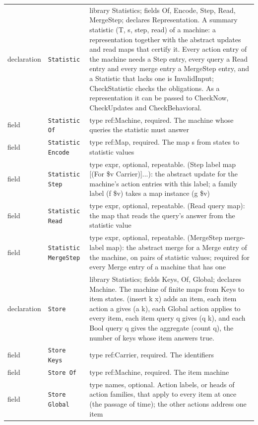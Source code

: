 \documentclass[11pt]{article}
\newcommand{\code}[1]{\texttt{#1}}
\theoremstyle{definition}
\theoremstyle{plain}
\begin{document}
\begin{footnotesize}
\begin{longtable}{>{\raggedright\arraybackslash}p{1.9cm}>{\raggedright\arraybackslash}p{3.3cm}>{\raggedright\arraybackslash}p{9.0cm}}
declaration & \code{Statistic} & library Statistics; fields Of, Encode, Step, Read, MergeStep; declares Representation. A summary statistic (T, s, step, read) of a machine:\allowbreak{} a representation together with the abstract updates and read maps that certify it.  Every action entry of the machine needs a Step entry, every query a Read entry and every merge entry a MergeStep entry, and a Statistic that lacks one is InvalidInput; CheckStatistic checks the obligations.  As a representation it can be passed to CheckNow, CheckUpdates and CheckBehavioral.\\
field & \code{Statistic Of} & type ref:\allowbreak{}Machine, required. The machine whose queries the statistic must answer\\
field & \code{Statistic Encode} & type ref:\allowbreak{}Map, required. The map s from states to statistic values\\
field & \code{Statistic Step} & type expr, optional, repeatable. (Step label map [(For \$v Carrier)]...):\allowbreak{} the abstract update for the machine's action entries with this label; a family label (f \$v) takes a map instance (g \$v)\\
field & \code{Statistic Read} & type expr, optional, repeatable. (Read query map):\allowbreak{} the map that reads the query's answer from the statistic value\\
field & \code{Statistic MergeStep} & type expr, optional, repeatable. (MergeStep merge-label map):\allowbreak{} the abstract merge for a Merge entry of the machine, on pairs of statistic values; required for every Merge entry of a machine that has one\\
declaration & \code{Store} & library Statistics; fields Keys, Of, Global; declares Machine. The machine of finite maps from Keys to item states.  (insert k x) adds an item, each item action a gives (a k), each Global action applies to every item, each item query q gives (q k), and each Bool query q gives the aggregate (count q), the number of keys whose item answers true.\\
field & \code{Store Keys} & type ref:\allowbreak{}Carrier, required. The identifiers\\
field & \code{Store Of} & type ref:\allowbreak{}Machine, required. The item machine\\
field & \code{Store Global} & type names, optional. Action labels, or heads of action families, that apply to every item at once (the passage of time); the other actions address one item\\

\end{longtable}
\end{footnotesize}
\end{document}
